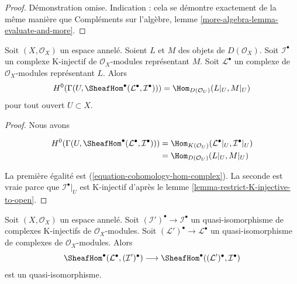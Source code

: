 {\begin{lemma}
\end{lemma}

\begin{proof}
Démonstration omise. Indication : cela se démontre exactement de la même manière que Compléments sur l'algèbre, lemme \ref{more-algebra-lemma-evaluate-and-more}.
\end{proof}

\begin{lemma}

\label{lemma-RHom-into-K-injective}
Soit $(X, \mathcal{O}_X)$ un espace annelé. Soient $L$ et $M$ des objets de $D(\mathcal{O}_X)$. Soit $\mathcal{I}^\bullet$ un complexe K-injectif de $\mathcal{O}_X$-modules représentant $M$. Soit $\mathcal{L}^\bullet$ un complexe de $\mathcal{O}_X$-modules représentant $L$. Alors $$
H^0(\Gamma(U, \SheafHom^\bullet(\mathcal{L}^\bullet, \mathcal{I}^\bullet))) =
\Hom_{D(\mathcal{O}_U)}(L|_U, M|_U)
$$ pour tout ouvert $U \subset X$.
\end{lemma}

\begin{proof}

Nous avons

\begin{align*}
H^0(\Gamma(U, \SheafHom^\bullet(\mathcal{L}^\bullet, \mathcal{I}^\bullet)))
& =
\Hom_{K(\mathcal{O}_U)}(\mathcal{L}^\bullet|_U, \mathcal{I}^\bullet|_U) \\
& =
\Hom_{D(\mathcal{O}_U)}(L|_U, M|_U)
\end{align*}

La première égalité est (\ref{equation-cohomology-hom-complex}). La seconde est vraie parce que $\mathcal{I}^\bullet|_U$
est K-injectif d'après le lemme \ref{lemma-restrict-K-injective-to-open}.

\end{proof}

\begin{lemma}

\label{lemma-RHom-well-defined}

Soit $(X, \mathcal{O}_X)$ un espace annelé. Soit
$(\mathcal{I}')^\bullet \to \mathcal{I}^\bullet$
un quasi-isomorphisme de complexes K-injectifs de $\mathcal{O}_X$-modules. Soit $(\mathcal{L}')^\bullet \to \mathcal{L}^\bullet$
un quasi-isomorphisme de complexes de $\mathcal{O}_X$-modules. Alors
$$
\SheafHom^\bullet(\mathcal{L}^\bullet, (\mathcal{I}')^\bullet)
\longrightarrow
\SheafHom^\bullet((\mathcal{L}')^\bullet, \mathcal{I}^\bullet)
$$
est un quasi-isomorphisme.

\end{lemma}

}
